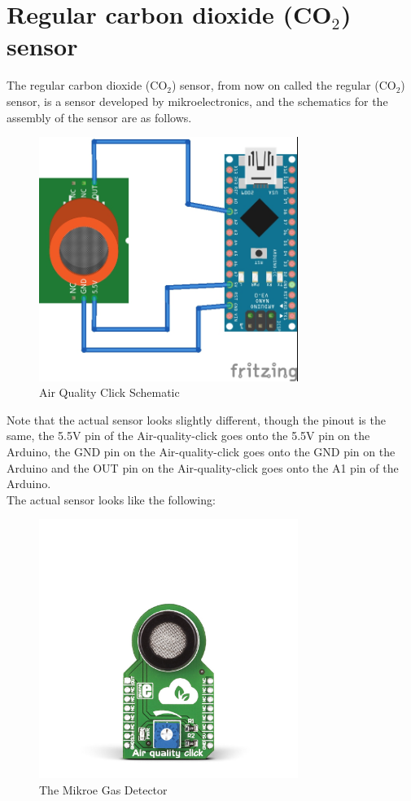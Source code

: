 \documentclass{report}
\begin{document}
\chapter{Regular carbon dioxide (CO$_2$) sensor}
The regular carbon dioxide (CO$_2$) sensor, from now on called the regular (CO$_2$) sensor, is a sensor developed by mikroelectronics, and the schematics for the assembly of the sensor are as follows. \\

\begin{figure}[H]
	\centering
\includegraphics[width=0.75\textwidth]{images/Mikroe-Gas-sensor-schematic.jpg}
	\caption{Air Quality Click Schematic}
\end{figure}

Note that the actual sensor looks slightly different, though the pinout is the same, the 5.5V pin of the Air-quality-click goes onto the 5.5V pin on the Arduino, the GND pin on the Air-quality-click  goes onto the GND pin on the Arduino and the OUT pin on the Air-quality-click goes onto the A1 pin of the Arduino. \\
The actual sensor looks like the following:\\

\begin{figure}[H]
	\centering
\includegraphics[width=0.75\textwidth]{images/air-quality-click-breakout.jpg} 
	\caption{The Mikroe Gas Detector}
\end{figure}
\end{document}
